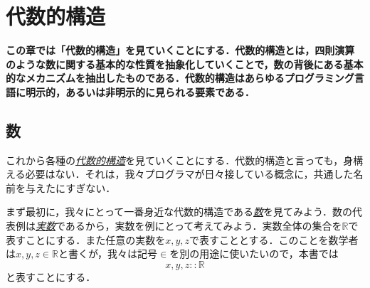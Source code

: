 \documentclass[a5paper,draft]{jsbook}
\newenvironment{leader}{\begingroup\bf}{\endgroup}
\newcommand{\keyword}[1]{{\underline{\emph{#1}}}}
\newcommand{\mathSpecialSet}[1]{\mathbb{#1}} %
\newcommand{\mathIn}{\mathrel{::}}
\begin{document}
\chapter{代数的構造}

\begin{leader}
この章では「代数的構造」を見ていくことにする．代数的構造とは，四則演算のような数に関する基本的な性質を抽象化していくことで，数の背後にある基本的なメカニズムを抽出したものである．代数的構造はあらゆるプログラミング言語に明示的，あるいは非明示的に見られる要素である．
\end{leader}

\section{数}

これから各種の\keyword{代数的構造}を見ていくことにする．代数的構造と言っても，身構える必要はない．それは，我々プログラマが日々接している概念に，共通した名前を与えたにすぎない．

まず最初に，我々にとって一番身近な代数的構造である\keyword{数}を見てみよう．数の代表例は\keyword{実数}であるから，実数を例にとって考えてみよう．実数全体の集合を$\mathSpecialSet{R}$で表すことにする．また任意の実数を$x,y,z$で表すこととする．このことを数学者は$x,y,z\in\mathSpecialSet{R}$と書くが，我々は記号$\in$を別の用途に使いたいので，本書では
\begin{equation}
x,y,z\mathIn\mathSpecialSet{R}
\end{equation}
と表すことにする．
\end{document}
